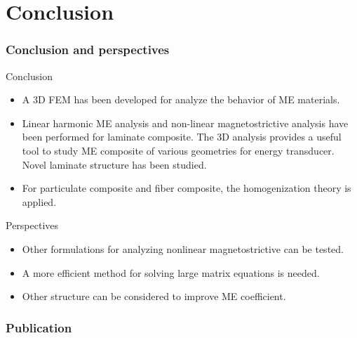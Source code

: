 \documentclass[compress]{beamer}
\begin{document}
\section{Conclusion}
\begin{frame}\frametitle{Conclusion and perspectives}
\begin{block}{Conclusion}
\begin{itemize}[label=$\bullet$, font=\small, leftmargin=*]
\item A 3D FEM has been developed for analyze the behavior of ME materials.
\item Linear harmonic ME analysis and non-linear magnetostrictive analysis have been performed for laminate composite. The 3D analysis provides a useful tool to study ME composite of various geometries for energy transducer. Novel laminate structure has been studied.
\item For particulate composite and fiber composite, the homogenization theory is applied.
\end{itemize}
\end{block}
\begin{exampleblock}{Perspectives}
\begin{itemize} [label=$\bullet$, font=\small, leftmargin=*]
\item Other formulations for analyzing nonlinear magnetostrictive can be tested.
\item A more efficient method for solving large matrix equations is needed.
\item Other structure can be considered to improve ME coefficient.
\end{itemize}
\end{exampleblock}
\end{frame}


\begin{frame}\frametitle{Publication}






\end{frame}

%        
%        
\end{document}
